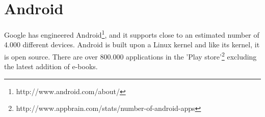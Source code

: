 \section{Android}
Google has engineered Android\footnote{http://www.android.com/about/}, and it supports close to an estimated number of 4.000 different devices. Android is built upon a Linux kernel and like its kernel, it is open source. There are over 800.000 applications in the 'Play store'\footnote{http://www.appbrain.com/stats/number-of-android-apps} excluding the latest addition of e-books.
